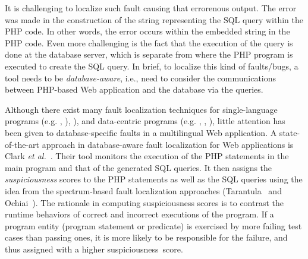 

It is challenging to localize such fault causing that errorenous
output. The error was made in the construction of the string
representing the SQL query within the PHP code. In other words, the
error occurs within the embedded string in the PHP code.  Even more
challenging is the fact that the execution of the query is done at the
database server, which is separate from where the PHP program is
executed to create the SQL query. In brief, to localize this kind of
faults/bugs, a tool needs to be {\em database-aware}, i.e., need to
consider the communications between PHP-based Web application and the
database via the queries.



Although there exist many fault localization techniques for
single-language programs (e.g. \cite{abreu-ochiai-07},
\cite{tarantula05}), \cite{liblit-pldi05}), and data-centric programs
(e.g. \cite{dor-issta08}, \cite{litvak10}, \cite{saha11}), little
attention has been given to database-specific faults in a multilingual
Web application.
%
A state-of-the-art approach in database-aware fault localization for
Web applications is Clark {\em et al.}~\cite{ga-ase11}. Their tool
monitors the execution of the PHP statements in the main program and
that of the generated SQL queries. It then assigns the
\emph{suspiciousness} scores to the PHP statements as well as the SQL
queries using the idea from the spectrum-based fault localization
approaches (Tarantula~\cite{tarantula05} and
Ochiai~\cite{abreu-ochiai-07}).
%
The rationale in computing suspiciousness scores is to contrast the
runtime behaviors of correct and incorrect executions of the program.
If a program entity (program statement or predicate) is exercised by
more failing test cases than passing ones, it is more likely to be
responsible for the failure, and thus assigned with a higher
suspiciousness~score.


